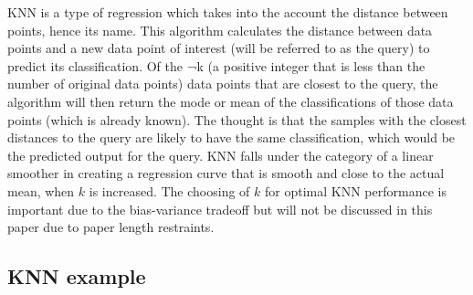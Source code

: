 \documentclass[12pt,openany]{book}
\begin{document}
KNN is a type of regression which takes into the account the distance
between points, hence its name. This algorithm calculates the distance
between data points and a new data point of interest (will be referred
to as the query) to predict its classification. Of the ¬k (a positive
integer that is less than the number of original data points) data
points that are closest to the query, the algorithm will then return the
mode or mean of the classifications of those data points (which is
already known). The thought is that the samples with the closest
distances to the query are likely to have the same classification, which
would be the predicted output for the query. KNN falls under the
category of a linear smoother in creating a regression curve that is
smooth and close to the actual mean, when \(k\) is increased. The
choosing of \(k\) for optimal KNN performance is important due to the
bias-variance tradeoff but will not be discussed in this paper due to
paper length restraints.

\subsection{KNN example}\label{knn-example}
\end{document}
